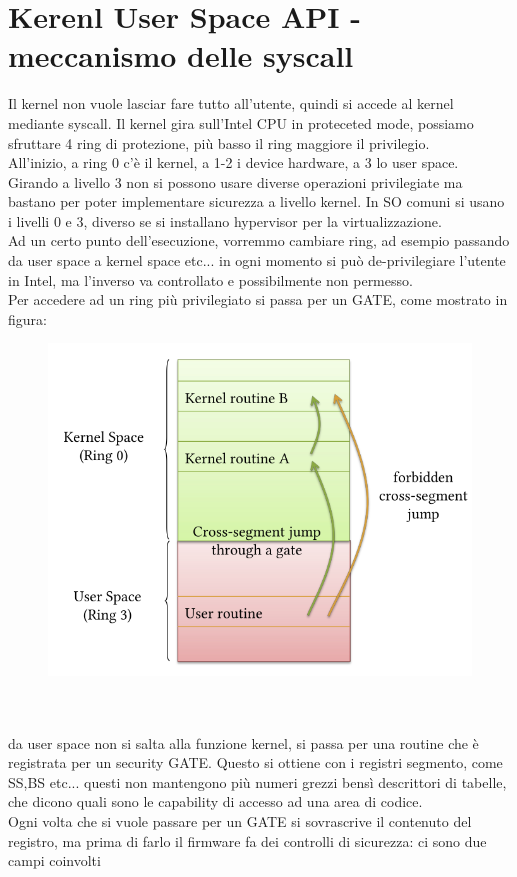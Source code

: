 \documentclass[12pt, oneside]{extbook} %
\begin{document}
\section{Kerenl User Space API - meccanismo delle syscall}
Il kernel non vuole lasciar fare tutto all'utente, quindi si accede al kernel mediante syscall. Il kernel gira sull'Intel CPU in proteceted mode, possiamo sfruttare 4 ring di protezione, più basso il ring maggiore il privilegio.\\All'inizio, a ring 0 c'è il kernel, a 1-2 i device hardware, a 3 lo user space. Girando a livello 3 non si possono usare diverse operazioni privilegiate ma bastano per poter implementare sicurezza a livello kernel. In SO comuni si usano i livelli 0 e 3, diverso se si installano hypervisor per la virtualizzazione.\\Ad un certo punto dell'esecuzione, vorremmo cambiare ring, ad esempio passando da user space a kernel space etc... in ogni momento si può de-privilegiare l'utente in Intel, ma l'inverso va controllato e possibilmente non permesso.\\Per accedere ad un ring più privilegiato si passa per un GATE, come mostrato in figura:\\
\begin{figure}[!h]
	\includegraphics[scale=0.4]{immagini/gates.png}
\end{figure}\\\\
da user space non si salta alla funzione kernel, si passa per una routine che è registrata per un security GATE. Questo si ottiene con i registri segmento, come SS,BS etc... questi non mantengono più numeri grezzi bensì descrittori di tabelle, che dicono quali sono le capability di accesso ad una area di codice.\\Ogni volta che si vuole passare per un GATE si sovrascrive il contenuto del registro, ma prima di farlo il firmware fa dei controlli di sicurezza: ci sono due campi coinvolti
\end{document}
